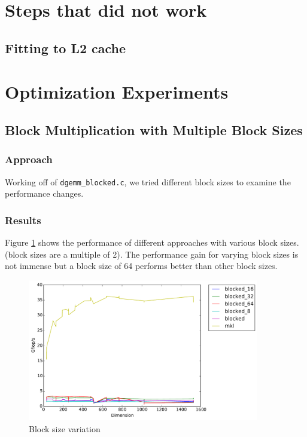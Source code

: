 \documentclass[11pt]{article}
\begin{document}
\newpage
\section{Steps that did not work}
\subsection{Fitting to L2 cache}

\newpage
\section{Optimization Experiments}
\subsection{Block Multiplication with Multiple Block Sizes} \label{sec:prev_block}
\subsubsection{Approach}
Working off of \texttt{dgemm\_blocked.c}, we tried different block sizes to examine the performance changes. 
\subsubsection{Results}
Figure \ref{pow_2_blocks} shows the performance of different approaches with various block sizes. (block sizes are a multiple of 2). The performance gain for varying block sizes is not immense but a block size of 64 performs better than other block sizes. \\

\begin{figure}[H]
    \includegraphics[width=0.9\textwidth]{timing_block_size_changes.pdf}
    \caption{Block size variation}
    \label{pow_2_blocks}
\end{figure} 
\end{document}
